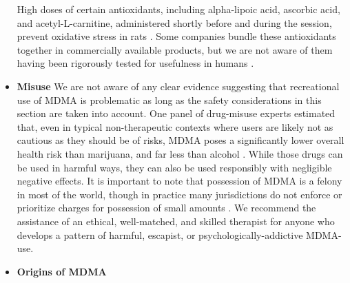 \documentclass[12pt,letterpaper]{book}
\begin{document}
\begin{itemize}
        High doses of certain antioxidants, including alpha-lipoic acid, ascorbic acid, and acetyl-L-carnitine, administered shortly before and during the session, prevent oxidative stress in rats \cite{aguirre1999alpha,shankaran2001ascorbic,alves2009acetyl}. Some companies bundle these antioxidants together in commercially available products, but we are not aware of them having been rigorously tested for usefulness in humans \cite{rollKit}.
    \item \textbf{Misuse}
        We are not aware of any clear evidence suggesting that recreational use of MDMA is problematic as long as the safety considerations in this section are taken into account. One panel of drug-misuse experts estimated that, even in typical non-therapeutic contexts where users are likely not as cautious as they should be of risks, MDMA poses a significantly lower overall health risk than marijuana, and far less than alcohol \cite{nuttDrugHarms}. While those drugs can be used in harmful ways, they can also be used responsibly with negligible negative effects. It is important to note that possession of MDMA is a felony in most of the world, though in practice many jurisdictions do not enforce or prioritize charges for possession of small amounts \cite{alphaLegalization}. We recommend the assistance of an ethical, well-matched, and skilled therapist for anyone who develops a pattern of harmful, escapist, or psychologically-addictive MDMA-use.
    \item \textbf{Origins of MDMA}

\end{itemize}
\end{document}
